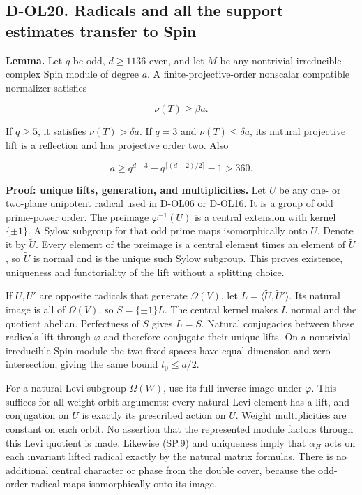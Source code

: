 \subsection{D-OL20. Radicals and all the support estimates transfer to Spin}\label{d-ol20.-radicals-and-all-the-support-estimates-transfer-to-spin}

\textbf{Lemma.} Let \(q\) be odd, \(d\ge1136\) even, and let \(M\) be any nontrivial irreducible complex Spin module of degree \(a\). A finite-projective-order nonscalar compatible normalizer satisfies

\[
 \nu(T)\ge\beta a.
 \tag{SP.12}
\]

If \(q\ge5\), it satisfies \(\nu(T)>\delta a\). If \(q=3\) and \(\nu(T)\le\delta a\), its natural projective lift is a reflection and has projective order two. Also

\[
 a\ge q^{d-3}-q^{\lceil(d-2)/2\rceil}-1>360.
 \tag{SP.13}
\]

\textbf{Proof: unique lifts, generation, and multiplicities.} Let \(U\) be any one- or two-plane unipotent radical used in D-OL06 or D-OL16. It is a group of odd prime-power order. The preimage \(\varphi^{-1}(U)\) is a central extension with kernel \(\{\pm1\}\). A Sylow subgroup for that odd prime maps isomorphically onto \(U\). Denote it by \(\widetilde U\). Every element of the preimage is a central element times an element of \(\widetilde U\), so \(\widetilde U\) is normal and is the unique such Sylow subgroup. This proves existence, uniqueness and functoriality of the lift without a splitting choice.

If \(U,U'\) are opposite radicals that generate \(\Omega(V)\), let \(L=\langle\widetilde U,\widetilde U'\rangle\). Its natural image is all of \(\Omega(V)\), so \(S=\{\pm1\}L\). The central kernel makes \(L\) normal and the quotient abelian. Perfectness of \(S\) gives \(L=S\). Natural conjugacies between these radicals lift through \(\varphi\) and therefore conjugate their unique lifts. On a nontrivial irreducible Spin module the two fixed spaces have equal dimension and zero intersection, giving the same bound \(t_0\le a/2\).

For a natural Levi subgroup \(\Omega(W)\), use its full inverse image under \(\varphi\). This suffices for all weight-orbit arguments: every natural Levi element has a lift, and conjugation on \(\widetilde U\) is exactly its prescribed action on \(U\). Weight multiplicities are constant on each orbit. No assertion that the represented module factors through this Levi quotient is made. Likewise (SP.9) and uniqueness imply that \(\alpha_H\) acts on each invariant lifted radical exactly by the natural matrix formulas. There is no additional central character or phase from the double cover, because the odd-order radical maps isomorphically onto its image.

